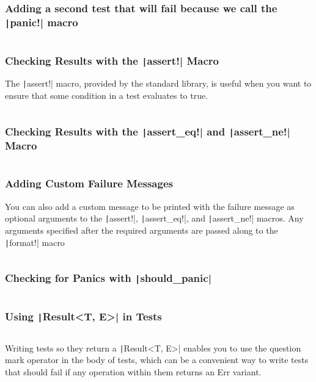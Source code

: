 \documentclass{beamer}
\begin{document}
\begin{frame}[fragile]
	\frametitle{ Adding a second test that will fail because we call the \texttt|panic!| macro}
	
	\inputminted{rust}{./code/test2.rs}
\end{frame}


\begin{frame}[fragile]
	\frametitle{Checking Results with the  \texttt|assert!| Macro}
	The \texttt|assert!| macro, provided by the standard library, is useful when you want to ensure that some condition in a test evaluates to true. 
	
	\inputminted[fontsize=\scriptsize]{rust}{./code/test3.rs}
\end{frame}

\begin{frame}[fragile]
	\frametitle{Checking Results with the \texttt|assert_eq!| and \texttt|assert_ne!| Macro}
	
	\inputminted{rust}{./code/test4.rs}
\end{frame}

\begin{frame}[fragile]
	\frametitle{Adding Custom Failure Messages}
	You can also add a custom message to be printed with the failure message as optional arguments to the \texttt|assert!|, \texttt|assert_eq!|, and \texttt|assert_ne!| macros. Any arguments specified after the required arguments are passed along to the \texttt|format!| macro
	
	\inputminted[fontsize=\scriptsize]{rust}{./code/test5.rs}
\end{frame}



\begin{frame}[fragile]
	\frametitle{Checking for Panics with \texttt|should_panic|}
	
	\inputminted[fontsize=\scriptsize]{rust}{./code/test6.rs}
\end{frame}



\begin{frame}[fragile]
	\frametitle{Using \texttt|Result<T, E>| in Tests}
	
	\inputminted{rust}{./code/test7.rs}
	
	Writing tests so they return a \texttt|Result<T, E>| enables you to use the question mark operator in the body of tests, which can be a convenient way to write tests that should fail if any operation within them returns an Err variant.
	
\end{frame}
\end{document}
